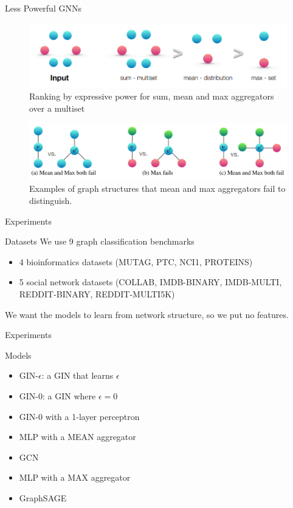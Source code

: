 \documentclass{beamer}
\theoremstyle{definition}
\begin{document}
\begin{frame}{Less Powerful GNNs}
    \begin{figure}
        \centering
        \includegraphics[scale=0.9]{expr_power_ranking.png}
        \caption{Ranking by expressive power for sum, mean and max aggregators over a multiset}
    \end{figure}
    \begin{figure}
        \centering
        \includegraphics[scale=0.9]{struc_fail_distinguish.png}
        \caption{Examples of graph structures that mean and max aggregators fail to distinguish.}
    \end{figure}
\end{frame}

\begin{frame}{Experiments}
    \begin{block}{Datasets}
        We use 9 graph classification benchmarks
        \begin{itemize}
            \item 4 bioinformatics datasets (MUTAG, PTC, NCI1, PROTEINS)
            \item 5 social network datasets (COLLAB, IMDB-BINARY, IMDB-MULTI, REDDIT-BINARY, REDDIT-MULTI5K)
        \end{itemize}
        We want the models to learn from network structure, so we put no features.
    \end{block}
\end{frame}

\begin{frame}{Experiments}
    \begin{block}{Models}
        \begin{itemize}
            \item GIN-\(\epsilon\): a GIN that learns \(\epsilon\)
            \item GIN-\(0\): a GIN where \(\epsilon = 0\)
            \item GIN-\(0\) with a 1-layer perceptron
            \item MLP with a MEAN aggregator
            \item GCN
            \item MLP with a MAX aggregator
            \item GraphSAGE
        \end{itemize}
    \end{block}
\end{frame}
\end{document}
